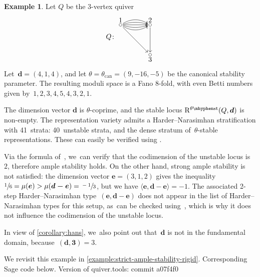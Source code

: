 \documentclass[11pt]{article}
\theoremstyle{plain}
\theoremstyle{definition}
\newtheorem{example}[theorem]{Example}
\newcommand\can{\ensuremath{\mathrm{can}}}
\newcommand\dash{\nobreakdash-\hspace{0pt}}
\newcommand\stable{\ensuremath{\mhyphen\mathrm{st}}}
\newcommand\tuple[1]{\ensuremath{{\boldsymbol{#1}}}}
\newif\ifcode
\begin{document}
\begin{example}
\label{example:strict-ample-stability}
Let $Q$ be the $3$-vertex quiver
\begin{equation}
Q\colon
\begin{tikzpicture}[baseline = -20pt, node distance = 1.5cm]
\node (1) {};
\node (2) [right of = 1] {};
\node (3) [below of = 2] {};
\draw (1) circle (2pt) node[above] {1};
\draw (2) circle (2pt) node[above] {2};
\draw (3) circle (2pt) node[below] {3};
\draw[->] (1) edge (3);
\draw[->] (2) edge (3);
\draw[->, bend left = 30] (1) edge (2);
\draw[->, bend left = 15] (1) edge (2);
\draw[->] (1) edge (2);
\draw[->, bend right = 15] (1) edge (2);
\draw[->, bend right = 30] (1) edge (2);
\end{tikzpicture}
\end{equation}
Let~$\tuple{d} = (4,1,4)$,
and let $\theta = \theta_\can = (9,-16,-5)$ be the canonical stability parameter.
The resulting moduli space is a Fano 8-fold,
with even Betti numbers given by~$1,2,3,4,5,4,3,2,1$.

The dimension vector $\tuple{d}$ is $\theta$-coprime,
and the stable locus $\repspace[\theta\stable]{Q,\tuple{d}}$ is non-empty.
The representation variety admits a Harder--Narasimhan stratification with 41~strata:
40~unstable strata, and the dense stratum of~$\theta$\dash stable representations.
These can easily be verified using \cite{quivertools}.

Via the formula of~\cite[Prop.\,3.4]{MR1974891}, we~can verify that the codimension of the unstable locus is~$2$, therefore ample stability holds.
On the other hand, strong ample stability is not satisfied:
the dimension vector $\tuple{e} = (3,1,2)$ gives the inequality~$\sfrac{1}{6} = \mu(\tuple{e}) > \mu(\tuple{d-e}) = \sfrac{-1}{3}$,
but we have $\langle \tuple{e}, \tuple{d} - \tuple{e}\rangle = -1$.
The associated 2-step Harder--Narasimhan type~$(\tuple{e},\tuple{d}-\tuple{e})$
does not appear in the list of Harder--Narasimhan types for this setup, as~can be checked using~\cite{quivertools},
which is why it does not influence the codimension of the unstable locus.

In view of \cref{corollary:hans}, we~also point out that~$\tuple{d}$ is not in the fundamental domain,
because~$(\tuple{d},\mathbf{3})=3$.

We revisit this example in \cref{example:strict-ample-stability-rigid}.
\ifcode
Corresponding Sage code below. Version of quiver.tools: commit a07f4f0


\end{example}
\end{document}
